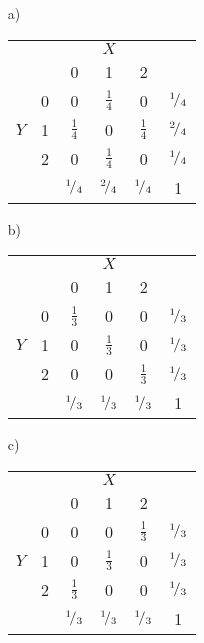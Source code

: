 \documentclass[twoside]{article}
\begin{document}
\begin{minipage}[t]{0.48\textwidth}
\begin{enumerate}
	\item[a)]
		\begin{tabular}{|cc|ccc|c|}\hline
				&		&	&$X$			&				&\\
				&		&0	&1				&2				&\\\hline
				&0	{}	&0						&$\frac{1}{4}$		&0					&${}^{1}\!/_{4}$\\
			$Y$	&1	{}	&$\frac{1}{4}$			&0					&$\frac{1}{4}$		&${}^{2}\!/_{4}$\\
				&2	{}	&0						&$\frac{1}{4}$		&0					&${}^{1}\!/_{4}$\\\hline
				&	{}	&${}^{1}\!/_{4}$			&${}^{2}\!/_{4}$	&${}^{1}\!/_{4}$	&1\\\hline
		\end{tabular}
	\item[b)]
		\begin{tabular}{|cc|ccc|c|}\hline
				&		&	&$X$			&				&\\
				&		&0	&1				&2				&\\\hline
				&0	{}	&$\frac{1}{3}$		&0					&0					&${}^{1}\!/_{3}$\\
			$Y$	&1	{}	&0					&$\frac{1}{3}$		&0					&${}^{1}\!/_{3}$\\
				&2	{}	&0					&0					&$\frac{1}{3}$		&${}^{1}\!/_{3}$\\\hline
				&	{}	&${}^{1}\!/_{3}$	&${}^{1}\!/_{3}$	&${}^{1}\!/_{3}$	&1\\\hline
		\end{tabular}
	\item[c)]
		\begin{tabular}{|cc|ccc|c|}\hline
				&		&	&$X$			&				&\\
				&		&0	&1				&2				&\\\hline
				&0	{}	&0					&0					&$\frac{1}{3}$		&${}^{1}\!/_{3}$\\
			$Y$	&1	{}	&0					&$\frac{1}{3}$		&0					&${}^{1}\!/_{3}$\\
				&2	{}	&$\frac{1}{3}$		&0					&0					&${}^{1}\!/_{3}$\\\hline
				&	{}	&${}^{1}\!/_{3}$	&${}^{1}\!/_{3}$	&${}^{1}\!/_{3}$	&1\\\hline
		\end{tabular}
\end{enumerate}
\end{minipage}\\
\vspace{.3cm}\\
\end{document}
